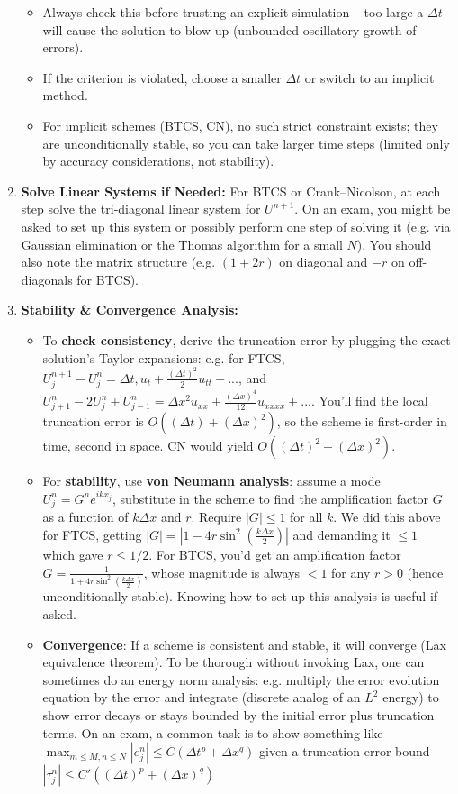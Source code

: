 \documentclass[a4paper,11pt]{report}
\begin{document}
\begin{enumerate}
\begin{itemize}
              \item Always check this before trusting an explicit simulation -- too large a $\Delta t$ will cause the solution to blow up (unbounded oscillatory growth of errors).

              \item If the criterion is violated, choose a smaller $\Delta t$ or switch to an implicit method.
                    \medskip
              \item For implicit schemes (BTCS, CN), no such strict constraint exists; they are unconditionally stable, so you can take larger time steps (limited only by accuracy considerations, not stability).
          \end{itemize}
    \item \textbf{Solve Linear Systems if Needed:} For BTCS or Crank--Nicolson, at each step solve the tri-diagonal linear system for $U^{n+1}$. On an exam, you might be asked to set up this system or possibly perform one step of solving it (e.g. via Gaussian elimination or the Thomas algorithm for a small $N$). You should also note the matrix structure (e.g. $(1+2r)$ on diagonal and $-r$ on off-diagonals for BTCS).
    \item \textbf{Stability \& Convergence Analysis:}
          \begin{itemize}
              \item To \textbf{check consistency}, derive the truncation error by plugging the exact solution’s Taylor expansions: e.g. for FTCS, $U_j^{n+1}-U_j^n = \Delta t, u_t + \frac{(\Delta t)^2}{2}u_{tt} + ...$, and $U_{j+1}^n - 2U_j^n + U_{j-1}^n = \Delta x^2 u_{xx} + \frac{(\Delta x)^4}{12}u_{xxxx}+...$. You’ll find the local truncation error is $O((\Delta t) + (\Delta x)^2)$, so the scheme is first-order in time, second in space. CN would yield $O((\Delta t)^2 + (\Delta x)^2)$.
              \item For \textbf{stability}, use \textbf{von Neumann analysis}: assume a mode $U_j^n = G^n e^{i k x_j}$, substitute in the scheme to find the amplification factor $G$ as a function of $k\Delta x$ and $r$. Require $|G|\le 1$ for all $k$. We did this above for FTCS, getting $|G| = |1 - 4r\sin^2(\frac{k\Delta x}{2})|$ and demanding it $\le 1$ which gave $r\le 1/2$. For BTCS, you’d get an amplification factor $G = \frac{1}{1+4r\sin^2(\frac{k\Delta x}{2})}$, whose magnitude is always $<1$ for any $r>0$ (hence unconditionally stable). Knowing how to set up this analysis is useful if asked.
              \item \textbf{Convergence}: If a scheme is consistent and stable, it will converge (Lax equivalence theorem). To be thorough without invoking Lax, one can sometimes do an energy norm analysis: e.g. multiply the error evolution equation by the error and integrate (discrete analog of an $L^2$ energy) to show error decays or stays bounded by the initial error plus truncation terms. On an exam, a common task is to show something like $\max_{m\le M, n\le N} |e_j^n| \le C(\Delta t^p + \Delta x^q)$ given a truncation error bound $|\tau_j^n| \le C'((\Delta t)^p + (\Delta x)^q)$

\end{itemize}
\end{enumerate}
\end{document}
